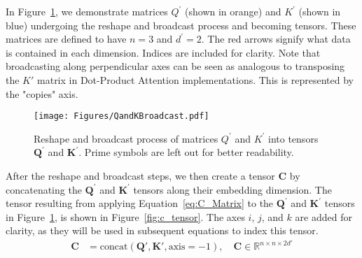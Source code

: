 \documentclass{article}
\begin{document}
In Figure~\ref{fig:reshape_and_broadcast}, we demonstrate matrices $\mathit{Q^{\prime}}$  (shown in orange) and $\mathit{K^{\prime}}$ (shown in blue) undergoing the reshape and broadcast process and becoming tensors. These matrices are defined to have $n=3$ and $d^{\prime}=2$. The red arrows signify what data is contained in each dimension. Indices are included for clarity. Note that broadcasting along perpendicular axes can be seen as analogous to transposing the $\mathit{K'}$ matrix in Dot-Product Attention implementations. This is represented by the "copies" axis.
\begin{figure}[H]
    \centering
    \texttt{[image: Figures/QandKBroadcast.pdf]}
    \caption{Reshape and broadcast process of  matrices $\mathit{Q^{\prime}}$ and $\mathit{K^{\prime}}$ into tensors $\mathbf{Q^{\prime}}$ and $\mathbf{K^{\prime}}$. Prime symbols are left out for better readability.}
\label{fig:reshape_and_broadcast}
\end{figure}

After the reshape and broadcast steps, we then create a tensor $\mathbf{C}$ by concatenating the $\mathbf{Q^{\prime}}$ and $\mathbf{K^{\prime}}$ tensors along their embedding dimension. The tensor resulting from applying Equation~\ref{eq:C_Matrix} to the $\mathbf{Q^{\prime}}$ and $\mathbf{K^{\prime}}$ tensors in Figure~\ref{fig:reshape_and_broadcast}, is shown in Figure~\ref{fig:c_tensor}. The axes $i$, $j$, and $k$ are added for clarity, as they will be used in subsequent equations to index this tensor.
\begin{align}
    \mathbf{C} &= \text{concat}(\mathbf{Q'}, \mathbf{K'}, \text{axis}=-1), \quad \mathbf{C} \in \mathbb{R}^{n \times n \times 2d'} \label{eq:C_Matrix}
\end{align}
\end{document}
